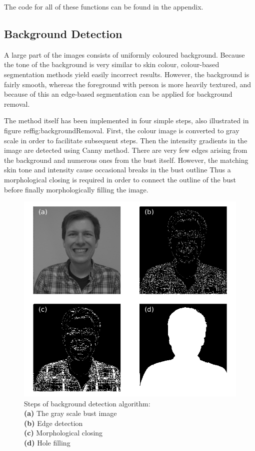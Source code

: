 \documentclass[journal]{IEEEtran}
\begin{document}
The code for all of these functions can be found in the appendix.

\subsection{Background Detection}
A large part of the images consists of uniformly coloured background.
Because the tone of the background is very similar to skin colour, colour-based segmentation methods yield easily incorrect results. 
However, the background is fairly smooth, whereas the foreground with person is more heavily textured, and because of this an edge-based segmentation can be applied for background removal.

The method itself has been implemented in four simple steps, also illustrated in figure ref{fig:backgroundRemoval}.
First, the colour image is converted to gray scale in order to facilitate subsequent steps.
Then the intensity gradients in the image are detected using Canny method.
There are very few edges arising from the background and numerous ones from the bust itself.
However, the matching skin tone and intensity cause occasional breaks in the bust outline 
Thus a morphological closing is required in order to connect the outline of the bust before finally morphologically filling the image.


\begin{figure}
    \centering
    \includegraphics[width=\linewidth]{BGRemoval.png}
    \caption{Steps of background detection algorithm:\\
        \textbf{(a)} The gray scale bust image\\
        \textbf{(b)} Edge detection\\
        \textbf{(c)} Morphological closing\\
        \textbf{(d)} Hole filling
    }
    \label{fig:backgroundRemoval}
\end{figure}
\end{document}
